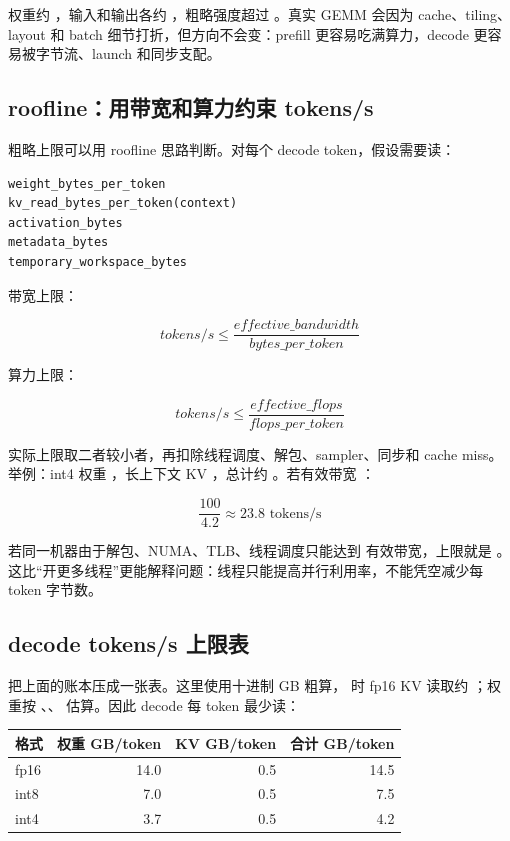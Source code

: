 权重约 ，输入和输出各约 ，粗略强度超过 。真实 GEMM 会因为 cache、tiling、layout 和 batch 细节打折，但方向不会变：prefill 更容易吃满算力，decode 更容易被字节流、launch 和同步支配。

\subsection{roofline：用带宽和算力约束 tokens/s}

粗略上限可以用 roofline 思路判断。对每个 decode token，假设需要读：

\begin{lstlisting}[numbers=none,caption={decode token 的粗略字节项}]
weight_bytes_per_token
kv_read_bytes_per_token(context)
activation_bytes
metadata_bytes
temporary_workspace_bytes
\end{lstlisting}

带宽上限：

\[
tokens/s \le
\frac{effective\_bandwidth}{bytes\_per\_token}
\]

算力上限：

\[
tokens/s \le
\frac{effective\_flops}{flops\_per\_token}
\]

实际上限取二者较小者，再扣除线程调度、解包、sampler、同步和 cache miss。举例：int4 权重 ，长上下文 KV ，总计约 。若有效带宽 ：

\[
\frac{100}{4.2}\approx23.8 \text{ tokens/s}
\]

若同一机器由于解包、NUMA、TLB、线程调度只能达到  有效带宽，上限就是 。这比“开更多线程”更能解释问题：线程只能提高并行利用率，不能凭空减少每 token 字节数。

\subsection{decode tokens/s 上限表}

把上面的账本压成一张表。这里使用十进制 GB 粗算， 时 fp16 KV 读取约 ；权重按 、、 估算。因此 decode 每 token 最少读：

\begin{center}
\begin{tabular}{lrrr}
\toprule
格式 & 权重 GB/token & KV GB/token & 合计 GB/token \\
\midrule
fp16 & 14.0 & 0.5 & 14.5 \\
int8 & 7.0 & 0.5 & 7.5 \\
int4 & 3.7 & 0.5 & 4.2 \\
\bottomrule
\end{tabular}
\end{center}

